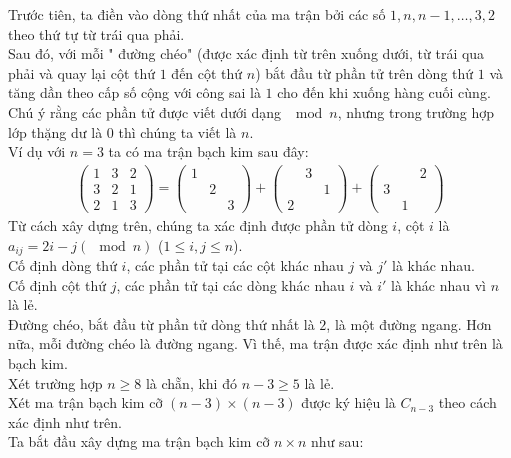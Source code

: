 \begin{ex}
{ Trước tiên, ta điền vào dòng thứ nhất của ma trận bởi các số  $1, n, n - 1, \ldots, 3, 2$ theo thứ tự từ trái qua phải.\\
 Sau đó, với mỗi " đường chéo" (được xác định từ trên xuống dưới, từ trái qua phải và quay lại cột thứ $1$ đến cột thứ $n$) bắt đầu từ phần tử trên dòng thứ $1$ và tăng dần theo cấp số cộng với công sai là $1$ cho đến khi xuống hàng cuối cùng. Chú ý rằng các phần tử được viết dưới dạng $\mod n$, nhưng trong trường hợp lớp thặng dư là $0$ thì chúng ta viết là $n$.\\
Ví dụ với $n = 3$ ta có ma trận bạch kim sau đây:
	\begin{align*}
	\begin{pmatrix}
	1 &3 &2\\
	3 & 2&1\\
	2&1&3
	\end{pmatrix} = 	\begin{pmatrix}
	1 &  & \\
	 & 2& \\
	& &3
	\end{pmatrix} + 	\begin{pmatrix}
	  &3 & \\
	 & &1\\
	2& & 
	\end{pmatrix} + \begin{pmatrix}
	   &   &2\\
	3 &   &  \\
	  &1& 
	\end{pmatrix}
	\end{align*}
Từ cách  xây dựng trên, chúng ta xác định được phần tử dòng $i$, cột $i$ là  $a_{ij} = 2i - j \left(\mod n\right)$ ($1\leq i, j\leq n$).\\
Cố định dòng thứ $i$, các phần tử tại các cột khác nhau $j$ và $j'$ là khác nhau.\\
Cố định cột thứ $j$, các phần tử tại các dòng khác nhau $i$ và $i'$ là khác nhau vì $n$ là lẻ.\\
Đường chéo, bắt đầu từ  phần tử dòng thứ nhất là $2$, là một đường ngang. Hơn nữa, mỗi đường chéo là đường ngang. Vì thế, ma trận được xác định như trên là bạch kim.\\
Xét trường hợp  $n\geq 8$ là chẵn, khi đó $n - 3\geq 5$ là lẻ.\\
Xét ma trận bạch kim cỡ $\left(n - 3\right)\times\left(n - 3\right)$  được ký hiệu là $C_{n - 3}$ theo cách xác định như trên.\\
Ta bắt đầu xây dựng ma trận bạch kim cỡ $n\times n$ như sau:
}
\end{ex}
